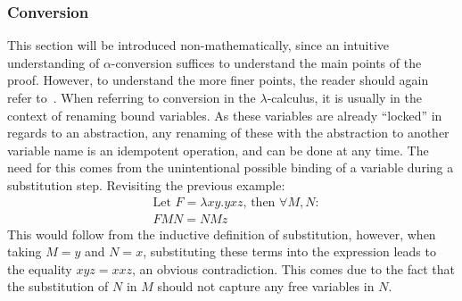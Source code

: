 \documentclass[11pt]{article}
\begin{document}
\subsubsection{Conversion}
This section will be introduced non-mathematically, since an intuitive understanding of $\alpha$-conversion suffices to understand the main points of the proof. However, to understand the more finer points, the reader should again refer to~\cite{barendregt1984lambda}.
When referring to conversion in the $\lambda$-calculus, it is usually in the context of renaming bound variables. As these variables are already \enquote{locked} in regards to an abstraction, any renaming of these with the abstraction to another variable name is an idempotent operation, and can be done at any time.
The need for this comes from the unintentional possible binding of a variable during a substitution step. Revisiting the previous example:
\begin{equation}
  \begin{split}
    & \text{Let } F = \lambda xy.yxz \text{, then } \forall M, N: \\
    & FMN = NMz
  \end{split}
\end{equation}
This would follow from the inductive definition of substitution, however, when taking $M = y$ and $N = x$, substituting these terms into the expression leads to the equality $xyz = xxz$, an obvious contradiction.
This comes due to the fact that the substitution of $N$ in $M$ should not capture any free variables in $N$.
\end{document}
